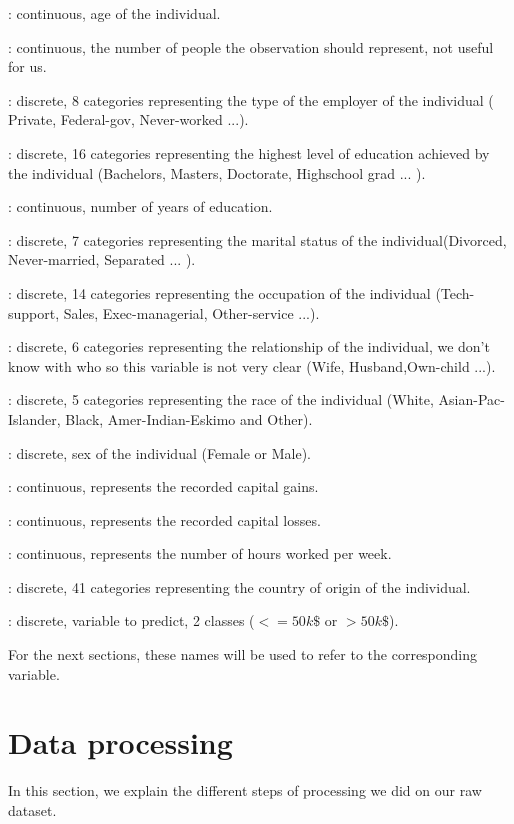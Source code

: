 \documentclass[12pt]{article}
\begin{document}
\begin{description}\itemsep0.5pt
\item[age] : continuous, age of the individual.
\item[fnlwgt] : continuous, the number of people the observation should represent, not useful for us.
\item[workclass] : discrete, 8 categories representing the type of the employer of the individual ( Private, Federal-gov, Never-worked ...).
\item[education] : discrete, 16 categories representing the highest level of education achieved by the individual (Bachelors, Masters, Doctorate, Highschool grad ... ).
\item[educationnum] : continuous, number of years of education.
\item[mstatus] : discrete, 7 categories representing the marital status of the individual(Divorced, Never-married, Separated ... ).
\item[occupation] : discrete, 14 categories representing the occupation of the individual (Tech-support, Sales, Exec-managerial, Other-service ...).
\item[relationship] : discrete, 6 categories representing the relationship of the individual, we don't know with who so this variable is not very clear (Wife, Husband,Own-child ...).
\item[race] : discrete, 5 categories representing the race of the individual (White, Asian-Pac-Islander, Black, Amer-Indian-Eskimo and Other).
\item[sex] : discrete, sex of the individual (Female or Male).
\item[capitalgain] : continuous, represents the recorded capital gains.
\item[capitalloss] : continuous, represents the recorded capital losses.
\item[hoursperweek] : continuous, represents the number of hours worked per week.
\item[nativecountry] : discrete, 41 categories representing the country of origin of the individual.
\item[target] : discrete, variable to predict, 2 classes ($<= 50k\$$ or $>50k\$$).
\end{description}
For the next sections, these names will be used to refer to the corresponding variable.
\section{Data processing}
In this section, we explain the different steps of processing we did on our raw dataset.
\end{document}

